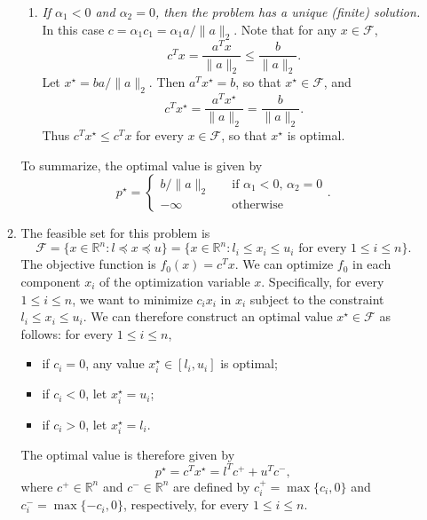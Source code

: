 \documentclass[letterpaper,12pt]{article}
\begin{document}
\begin{enumerate}
\begin{enumerate}
\begin{enumerate}
  \item \textit{If $\alpha_1 < 0$ and $\alpha_2 = 0$, then the problem
      has a unique (finite) solution.} In this case
    $c = \alpha_1 c_1 = \alpha_1 a / \lVert a \rVert_2$. Note that for
    any $x \in \mathcal{F}$,
    \begin{equation*}
      c^T x = \frac{a^T x}{\lVert a \rVert_2} \leq \frac{b}{\lVert a \rVert_2}.
    \end{equation*}
    Let $x^\star = ba / \lVert a \rVert_2$. Then $a^T x^\star = b$, so
    that $x^\star \in \mathcal{F}$, and
    \begin{equation*}
      c^T x^\star = \frac{a^T x^\star}{\lVert a \rVert_2}
        = \frac{b}{\lVert a \rVert_2}.
    \end{equation*}
    Thus $c^T x^\star \leq c^T x$ for every $x \in \mathcal{F}$, so
    that $x^\star$ is optimal.
  \end{enumerate}
  To summarize, the optimal value is given by
  \begin{equation*}
    p^\star = \begin{cases}
      b / \lVert a \rVert_2 &\quad \text{if $\alpha_1 < 0$, $\alpha_2 = 0$} \\
      -\infty &\quad \text{otherwise}
    \end{cases}.
  \end{equation*}

\item The feasible set for this problem is
  \begin{equation*}
    \mathcal{F} = \{x \in \mathbb{R}^n : l \preceq x \preceq u\}
      = \{x \in \mathbb{R}^n :
          \text{$l_i \leq x_i \leq u_i$ for every $1 \leq i \leq n$}\}.
  \end{equation*}
  The objective function is $f_0(x) = c^T x$. We can optimize $f_0$ in
  each component $x_i$ of the optimization variable $x$. Specifically,
  for every $1 \leq i \leq n$, we want to minimize $c_i x_i$ in $x_i$
  subject to the constraint $l_i \leq x_i \leq u_i$. We can therefore
  construct an optimal value $x^\star \in \mathcal{F}$ as follows: for
  every $1 \leq i \leq n$,
  \begin{itemize}
  \item if $c_i = 0$, any value $x^\star_i \in [l_i, u_i]$ is optimal;
  \item if $c_i < 0$, let $x^\star_i = u_i$;
  \item if $c_i > 0$, let $x^\star_i = l_i$.
  \end{itemize}
  The optimal value is therefore given by
  \begin{equation*}
    p^\star = c^T x^\star = l^T c^+ + u^T c^-,
  \end{equation*}
  where $c^+ \in \mathbb{R}^n$ and $c^- \in \mathbb{R}^n$ are defined
  by $c^+_i = \max\{c_i, 0\}$ and $c^-_i = \max\{-c_i, 0\}$,
  respectively, for every $1 \leq i \leq n$.


\end{enumerate}
\end{enumerate}
\end{document}
